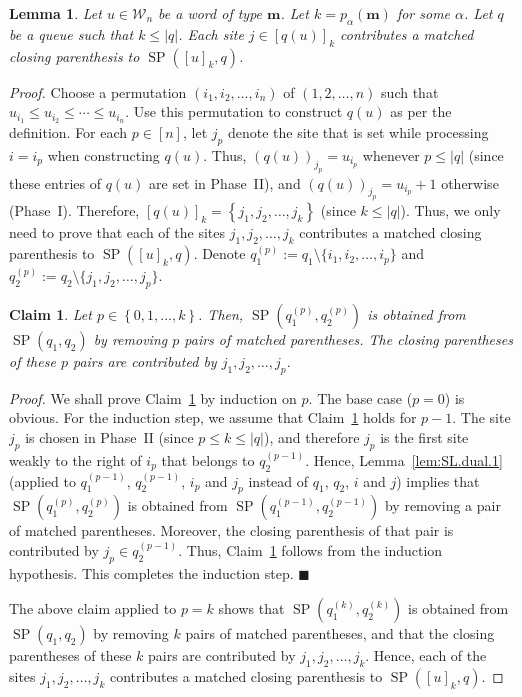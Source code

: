 \documentclass[reqno]{amsart}
\newcommand{\0}{\phantom{c}}
\DeclareMathOperator{\SP}{SP} %
\newcommand{\mm}{\mathbf{m}}
\newcommand{\mcW}{\mathcal{W}}
\newenvironment{subproof}{\textit{Proof.} }{\hfill$\blacksquare$\medskip}
\newcommand{\set}[1]{\left\{ #1 \right\}}
\newcommand{\abs}[1]{\left| #1 \right|}
\newcommand{\ive}[1]{\left[ #1 \right]}
\theoremstyle{plain}
\newtheorem{lemma}[thm]{Lemma}
\newtheorem{claim}[thm]{Claim}
\theoremstyle{definition}
\numberwithin{equation}{section}
\begin{document}
\begin{lemma} \label{lem:SL.dual.3}
Let $u \in \mcW_n$ be a word of type $\mm$.
Let $k = p_{\alpha}(\mm)$ for some $\alpha$.
Let $q$ be a queue such that $k \leq \abs{q}$.
Each site $j \in \ive{q(u)}_k$ contributes a matched closing parenthesis to $\SP(\ive{u}_k, q)$.
\end{lemma}

\begin{proof}
Choose a permutation $(i_1, i_2, \dotsc, i_n)$ of $(1, 2, \dotsc, n)$ such that $u_{i_1} \leq u_{i_2} \leq \cdots \leq u_{i_n}$.
Use this permutation to construct $q(u)$ as per the definition.
For each $p \in \ive{n}$, let $j_p$ denote the site that is set while processing $i = i_p$ when constructing $q(u)$.
Thus, $(q(u))_{j_p} = u_{i_p}$ whenever $p \leq \abs{q}$ (since these entries of $q(u)$ are set in Phase~II),
and $(q(u))_{j_p} = u_{i_p} + 1$ otherwise (Phase~I).
Therefore, $\ive{q(u)}_k = \set{j_1, j_2, \ldots, j_k}$ (since $k \leq \abs{q}$).
Thus, we only need to prove that each of the sites $j_1, j_2, \ldots, j_k$ contributes a matched closing parenthesis to $\SP(\ive{u}_k, q)$.
Denote $q_1^{(p)} := q_1 \setminus \{i_1, i_2, \dotsc, i_p\}$ and $q_2^{(p)} := q_2 \setminus \{j_1, j_2, \dotsc, j_p\}$.

\begin{claim}
\label{claim:matching_SP}
Let $p \in \set{0, 1, \ldots, k}$.
Then, $\SP(q_1^{(p)}, q_2^{(p)})$ is obtained from $\SP(q_1 , q_2)$ by removing $p$ pairs of matched parentheses.
The closing parentheses of these $p$ pairs are contributed by $j_1, j_2, \ldots, j_p$.
\end{claim}

\begin{subproof}
We shall prove Claim~\ref{claim:matching_SP} by induction on $p$.
The base case ($p = 0$) is obvious.
For the induction step, we assume that Claim~\ref{claim:matching_SP} holds for $p-1$.
The site $j_p$ is chosen in Phase~II (since $p \leq k \leq \abs{q}$), and therefore $j_p$ is the first site weakly to the right of $i_p$ that belongs to $q_2^{(p-1)}$.
Hence, Lemma~\ref{lem:SL.dual.1}
(applied to $q_1^{(p-1)}$, $q_2^{(p-1)}$, $i_p$ and $j_p$ instead of $q_1$, $q_2$, $i$ and $j$)
implies that $\SP(q_1^{(p)}, q_2^{(p)})$ is obtained from $\SP(q_1^{(p-1)}, q_2^{(p-1)})$ by removing a pair of matched parentheses.
Moreover, the closing parenthesis of that pair is contributed by $j_p \in q_2^{(p-1)}$.
Thus, Claim~\ref{claim:matching_SP} follows from the induction hypothesis.
This completes the induction step.
\end{subproof}

The above claim applied to $p = k$ shows that $\SP(q_1^{(k)}, q_2^{(k)})$ is obtained from $\SP(q_1 , q_2)$ by removing $k$ pairs of matched parentheses, and that the closing parentheses of these $k$ pairs are contributed by $j_1, j_2, \ldots, j_k$.
Hence, each of the sites $j_1, j_2, \ldots, j_k$ contributes a matched closing parenthesis to $\SP(\ive{u}_k, q)$.
\end{proof}
\end{document}
